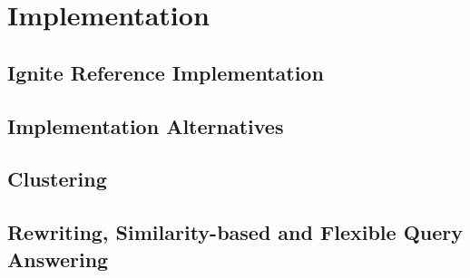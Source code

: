 
\section{Implementation}
\label{sec:impl}


\subsection{Ignite Reference Implementation}
\label{sec:impl_refimpl}

\subsection{Implementation Alternatives}
\label{sec:impl_alter}

\subsection{Clustering}
\label{sec:impl_clust}

\subsection{Rewriting, Similarity-based and Flexible Query Answering}
\label{sec:impl_fqa}